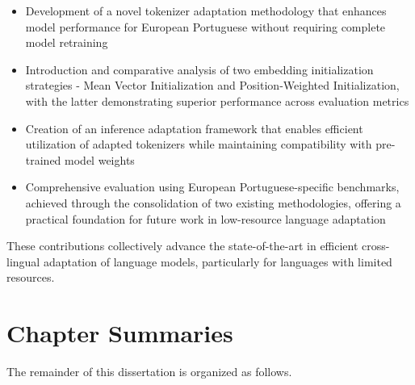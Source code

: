 \begin{itemize}
    \item Development of a novel tokenizer adaptation methodology that enhances model performance for European Portuguese without requiring complete model retraining
    
    \item Introduction and comparative analysis of two embedding initialization strategies - Mean Vector Initialization and Position-Weighted Initialization, with the latter demonstrating superior performance across evaluation metrics
    
    \item Creation of an inference adaptation framework that enables efficient utilization of adapted tokenizers while maintaining compatibility with pre-trained model weights
    
    \item Comprehensive evaluation using European Portuguese-specific benchmarks, achieved through the consolidation of two existing methodologies, offering a practical foundation for future work in low-resource language adaptation
\end{itemize}

These contributions collectively advance the state-of-the-art in efficient cross-lingual adaptation of language models, particularly for languages with limited resources.

\section{Chapter Summaries}\label{Section1.5}
The remainder of this dissertation is organized as follows.

